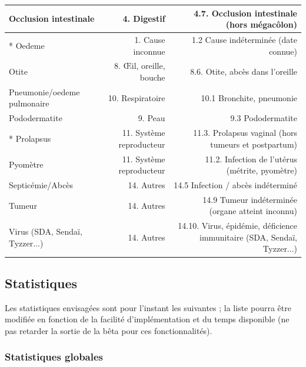 ﻿\documentclass[a4paper,10pt]{article}
\begin{document}
\begin{tabularx}{\textwidth}{|l|R|R|}
Occlusion intestinale & 4. Digestif & 4.7. Occlusion intestinale (hors mégacôlon)\\\hline
* Oedeme & 1. Cause inconnue & 1.2 Cause indéterminée (date connue)\\\hline
Otite & 8. Œil, oreille, bouche & 8.6. Otite, abcès dans l'oreille\\\hline
Pneumonie/oedeme pulmonaire & 10. Respiratoire & 10.1 Bronchite, pneumonie\\\hline
Pododermatite & 9. Peau & 9.3 Pododermatite\\\hline
* Prolapsus & 11. Système reproducteur & 11.3. Prolapsus vaginal (hors tumeurs et postpartum)\\\hline
Pyomètre & 11. Système reproducteur & 11.2.  Infection de l'utérus (métrite, pyomètre)\\\hline
Septicémie/Abcès & 14. Autres & 14.5 Infection / abcès indéterminé\\\hline
Tumeur & 14. Autres & 14.9 Tumeur indéterminée (organe atteint inconnu)\\\hline
Virus (SDA, Sendaï, Tyzzer...) & 14. Autres & 14.10. Virus, épidémie, déficience immunitaire (SDA, Sendaï, Tyzzer...)\\\hline
\end{tabularx}
\normalsize

\subsection{Statistiques}
\label{app:stats}

Les statistiques envisagées sont pour l'instant les suivantes ; la liste pourra être modifiée en fonction de la facilité d'implémentation et du temps disponible (ne pas retarder la sortie de la bêta pour ces fonctionnalités).

\subsubsection{Statistiques globales}
 
\end{document}
